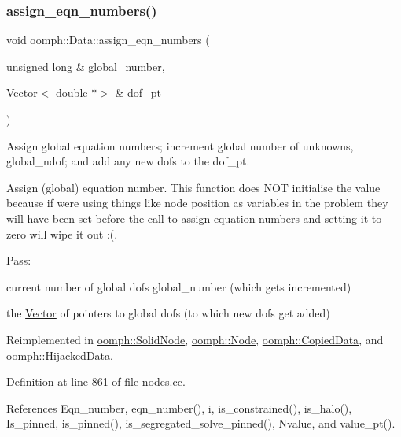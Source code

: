 \subsubsection{\texorpdfstring{assign\+\_\+eqn\+\_\+numbers()}{assign\_eqn\_numbers()}}
{\footnotesize\ttfamily void oomph\+::\+Data\+::assign\+\_\+eqn\+\_\+numbers (\begin{DoxyParamCaption}\item[{unsigned long \&}]{global\+\_\+number,  }\item[{\hyperlink{classoomph_1_1Vector}{Vector}$<$ double $\ast$$>$ \&}]{dof\+\_\+pt }\end{DoxyParamCaption})\hspace{0.3cm}{\ttfamily [virtual]}}



Assign global equation numbers; increment global number of unknowns, global\+\_\+ndof; and add any new dofs to the dof\+\_\+pt. 

Assign (global) equation number. This function does N\+OT initialise the value because if we\textquotesingle{}re using things like node position as variables in the problem they will have been set before the call to assign equation numbers and setting it to zero will wipe it out \+:(.

Pass\+:
\begin{DoxyItemize}
\item current number of global dofs global\+\_\+number (which gets incremented)
\item the \hyperlink{classoomph_1_1Vector}{Vector} of pointers to global dofs (to which new dofs get added) 
\end{DoxyItemize}

Reimplemented in \hyperlink{classoomph_1_1SolidNode_aae4b4c238455ded700e5aac8b058e27d}{oomph\+::\+Solid\+Node}, \hyperlink{classoomph_1_1Node_a84ee77907c07ede64d98e809d9b0ffe0}{oomph\+::\+Node}, \hyperlink{classoomph_1_1CopiedData_a41e228dd49d078dd35520992d57f0f5f}{oomph\+::\+Copied\+Data}, and \hyperlink{classoomph_1_1HijackedData_a960b9595a1d8049de58c76d3573d3a35}{oomph\+::\+Hijacked\+Data}.



Definition at line 861 of file nodes.\+cc.



References Eqn\+\_\+number, eqn\+\_\+number(), i, is\+\_\+constrained(), is\+\_\+halo(), Is\+\_\+pinned, is\+\_\+pinned(), is\+\_\+segregated\+\_\+solve\+\_\+pinned(), Nvalue, and value\+\_\+pt().



